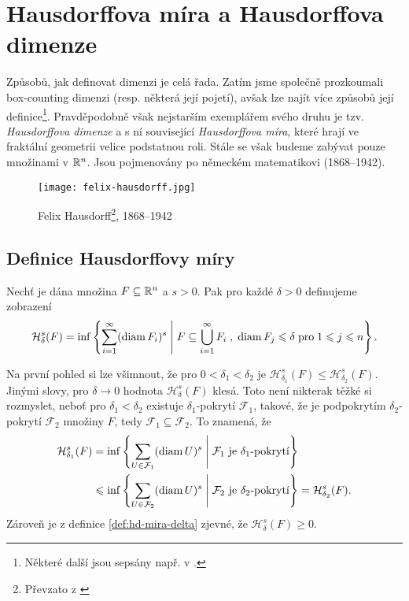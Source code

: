 \section{Hausdorffova míra a Hausdorffova dimenze}\label{sec:hausdorffova-mira-dimenze}

Způsobů, jak definovat dimenzi je celá řada. Zatím jsme společně prozkoumali box-counting dimenzi (resp. některá její pojetí), avšak lze najít více způsobů její definice\footnote{Některé další jsou sepsány např. v \citep[str. 40]{Falconer2014}.}. Pravděpodobně však nejstarším exemplářem svého druhu je tzv. \emph{Hausdorffova dimenze} a s ní související \emph{Hausdorffova míra}, které hrají ve fraktální geometrii velice podstatnou roli. Stále se však budeme zabývat pouze množinami v $\mathbb{R}^n$. Jsou pojmenovány po německém matematikovi  (1868--1942).
\begin{figure}[h]
    \centering
    \texttt{[image: felix-hausdorff.jpg]}
    \caption[Felix Hausdorff, 1868--1942]{Felix Hausdorff\footnote{Převzato z \cite{OConnorHausdorff2025}}, 1868--1942}
    \label{fig:felix-hausdorff}
\end{figure}

\subsection{Definice Hausdorffovy míry}\label{subsec:hd-mira-definice}

\begin{definition}\label{def:hd-mira-delta}
    Nechť je dána množina $F\subseteq\mathbb{R}^n$ a $s>0$. Pak pro každé $\delta>0$ definujeme zobrazení
    \[\mathcal{H}_\delta^s(F)=\inf\left\{\sum_{i=1}^{\infty}(\operatorname{diam}{F_i})^s\;\middle|\;F\subseteq\bigcup_{i=1}^\infty F_i\;,\;\operatorname{diam}{F_j}\leqslant\delta\;\text{pro}\;1\leqslant j\leqslant n\right\}.\]
\end{definition}
Na první pohled si lze všimnout, že pro $0<\delta_1<\delta_2$ je $\mathcal{H}_{\delta_1}^s(F)\leqslant\mathcal{H}_{\delta_2}^s(F)$. Jinými slovy, pro $\delta\to 0$ hodnota $\mathcal{H}_\delta^s(F)$ klesá. Toto není nikterak těžké si rozmyslet, neboť pro $\delta_1<\delta_2$ existuje $\delta_1$-pokrytí $\mathcal{F}_1$, takové, že je podpokrytím $\delta_2$-pokrytí $\mathcal{F}_2$ množiny $F$, tedy $\mathcal{F}_1\subseteq\mathcal{F}_2$. To znamená, že
\begin{align*}
    \mathcal{H}_{\delta_1}^s(F)&=\inf\left\{\sum_{U\in\mathcal{F}_1}(\operatorname{diam}{U})^s\;\middle|\;\text{$\mathcal{F}_1$ je $\delta_1$-pokrytí}\right\}\\
    &\leqslant\inf\left\{\sum_{U\in\mathcal{F}_2}(\operatorname{diam}{U})^s\;\middle|\;\text{$\mathcal{F}_2$ je $\delta_2$-pokrytí}\right\}=\mathcal{H}_{\delta_2}^s(F).
\end{align*}
Zároveň je z definice \ref{def:hd-mira-delta} zjevné, že $\mathcal{H}_\delta^s(F)\geqslant 0$.

